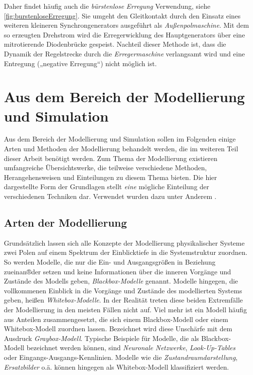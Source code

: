 Daher findet häufig auch die \emph{bürstenlose Erregung} Verwendung, siehe \cref{fig:burstenloseErregung}. Sie umgeht den Gleitkontakt durch den Einsatz eines weiteren kleineren Synchrongenerators ausgeführt als \emph{Außenpolmaschine}. Mit dem so erzeugten Drehstrom wird die Erregerwicklung des Hauptgenerators über eine mitrotierende Diodenbrücke gespeist. Nachteil dieser Methode ist, dass die Dynamik der Regelstrecke durch die \emph{Erregermaschine} verlangsamt wird und eine Entregung („negative Erregung“) nicht möglich ist. 


\section{Aus dem Bereich der Modellierung und Simulation}
\label{sec:GrundlagenModellierung}
Aus dem Bereich der Modellierung und Simulation sollen im Folgenden einige Arten und Methoden der Modellierung behandelt werden, die im weiteren Teil dieser Arbeit benötigt werden. Zum Thema der Modellierung existieren umfangreiche Übersichtswerke, die teilweise verschiedene Methoden, Herangehensweisen und Einteilungen zu diesem Thema bieten. Die hier dargestellte Form der Grundlagen stellt \emph{eine} mögliche Einteilung der verschiedenen Techniken dar. Verwendet wurden dazu unter Anderem \cites{janschekSystementwurfMechatronischerSysteme2010,gesenhuesObjektorientiertmodellbasierteCharakterisierungUberwachung2019,schroderElektrischeAntriebeRegelung2015}.

\subsection{Arten der Modellierung}
\label{subsec:ArtenModellierung}
Grundsätzlich lassen sich alle Konzepte der Modellierung physikalischer Systeme zwei Polen auf einem Spektrum der Einblicktiefe in die Systemstruktur zuordnen. So werden Modelle, die nur die Ein- und Ausgangsgrößen in Beziehung zueinan®der setzen und keine Informationen über die inneren Vorgänge und Zustände des Modells geben, \emph{Blackbox-Modelle} genannt. Modelle hingegen, die vollkommenen Einblick in die Vorgänge und Zustände des modellierten Systems geben, heißen \emph{Whitebox-Modelle}. In der Realität treten diese beiden Extremfälle der Modellierung in den meisten Fällen nicht auf. Viel mehr ist ein Modell häufig aus Anteilen zusammengesetzt, die sich einem Blackbox-Modell oder einem Whitebox-Modell zuordnen lassen. Bezeichnet wird diese Unschärfe mit dem Ausdruck \emph{Graybox-Modell}. Typische Beispiele für Modelle, die als Blackbox-Modell bezeichnet werden können, sind \emph{Neuronale Netzwerke}, \emph{Look-Up-Tables} oder Eingangs-Ausgangs-Kennlinien. Modelle wie die \emph{Zustandraumdarstellung}, \emph{Ersatzbilder} o.ä. können hingegen als Whitebox-Modell klassifiziert werden. 


